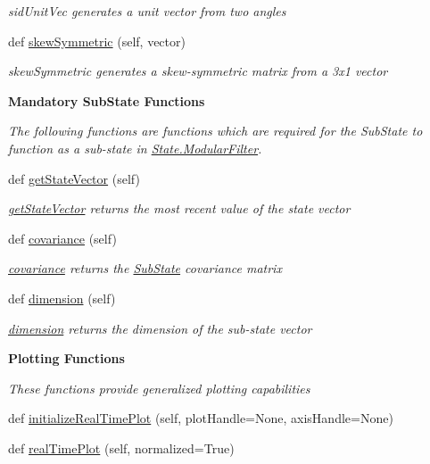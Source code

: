 \begin{DoxyCompactItemize}
\begin{DoxyCompactList}\small\item\em sid\+Unit\+Vec generates a unit vector from two angles \end{DoxyCompactList}\item 
def \hyperlink{classAttitudeSubstate_1_1AttitudeState6DOF_afe4e6f5ef09bd1fab2e390f3748af76a}{skew\+Symmetric} (self, vector)
\begin{DoxyCompactList}\small\item\em skew\+Symmetric generates a skew-\/symmetric matrix from a 3x1 vector \end{DoxyCompactList}\end{DoxyCompactItemize}
\begin{Indent}{\bf Mandatory Sub\+State Functions}\par
{\em The following functions are functions which are required for the Sub\+State to function as a sub-\/state in \hyperlink{classState_1_1ModularFilter}{State.\+Modular\+Filter}. }\begin{DoxyCompactItemize}
\item 
def \hyperlink{classSubStates_1_1SubState_a3ebd1a120f63ed477ee76999518a8828}{get\+State\+Vector} (self)
\begin{DoxyCompactList}\small\item\em \hyperlink{classSubStates_1_1SubState_a3ebd1a120f63ed477ee76999518a8828}{get\+State\+Vector} returns the most recent value of the state vector \end{DoxyCompactList}\item 
def \hyperlink{classSubStates_1_1SubState_a4d863939fdb98b2739e1e737ec7496ae}{covariance} (self)
\begin{DoxyCompactList}\small\item\em \hyperlink{classSubStates_1_1SubState_a4d863939fdb98b2739e1e737ec7496ae}{covariance} returns the \hyperlink{classSubStates_1_1SubState}{Sub\+State} covariance matrix \end{DoxyCompactList}\item 
def \hyperlink{classSubStates_1_1SubState_a4aebea19a134cb871a7c0b6c2709546a}{dimension} (self)
\begin{DoxyCompactList}\small\item\em \hyperlink{classSubStates_1_1SubState_a4aebea19a134cb871a7c0b6c2709546a}{dimension} returns the dimension of the sub-\/state vector \end{DoxyCompactList}\end{DoxyCompactItemize}
\end{Indent}
\begin{Indent}{\bf Plotting Functions}\par
{\em These functions provide generalized plotting capabilities }\begin{DoxyCompactItemize}
\item 
def \hyperlink{classSubStates_1_1SubState_ab1767fb43256809f722a9f6dc73fef19}{initialize\+Real\+Time\+Plot} (self, plot\+Handle=None, axis\+Handle=None)
\item 
def \hyperlink{classSubStates_1_1SubState_a8df931305220bef14684e76fd6743b0d}{real\+Time\+Plot} (self, normalized=True)
\end{DoxyCompactItemize}
\end{Indent}

